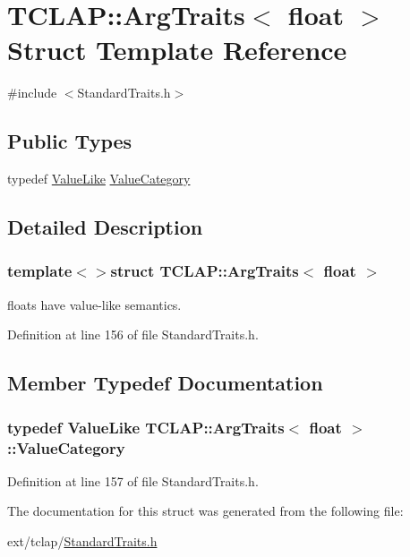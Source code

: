 \hypertarget{struct_t_c_l_a_p_1_1_arg_traits_3_01float_01_4}{}\section{T\+C\+L\+A\+P\+:\+:Arg\+Traits$<$ float $>$ Struct Template Reference}
\label{struct_t_c_l_a_p_1_1_arg_traits_3_01float_01_4}


{\ttfamily \#include $<$Standard\+Traits.\+h$>$}

\subsection*{Public Types}
\begin{DoxyCompactItemize}
\item 
typedef \hyperlink{struct_t_c_l_a_p_1_1_value_like}{Value\+Like} \hyperlink{struct_t_c_l_a_p_1_1_arg_traits_3_01float_01_4_ace983d74b1b28caa692840da15313acf}{Value\+Category}
\end{DoxyCompactItemize}


\subsection{Detailed Description}
\subsubsection*{template$<$$>$struct T\+C\+L\+A\+P\+::\+Arg\+Traits$<$ float $>$}

floats have value-\/like semantics. 

Definition at line 156 of file Standard\+Traits.\+h.



\subsection{Member Typedef Documentation}
\hypertarget{struct_t_c_l_a_p_1_1_arg_traits_3_01float_01_4_ace983d74b1b28caa692840da15313acf}{}
\subsubsection[{Value\+Category}]{\setlength{\rightskip}{0pt plus 5cm}typedef {\bf Value\+Like} {\bf T\+C\+L\+A\+P\+::\+Arg\+Traits}$<$ float $>$\+::{\bf Value\+Category}}\label{struct_t_c_l_a_p_1_1_arg_traits_3_01float_01_4_ace983d74b1b28caa692840da15313acf}


Definition at line 157 of file Standard\+Traits.\+h.



The documentation for this struct was generated from the following file\+:\begin{DoxyCompactItemize}
\item 
ext/tclap/\hyperlink{_standard_traits_8h}{Standard\+Traits.\+h}\end{DoxyCompactItemize}
